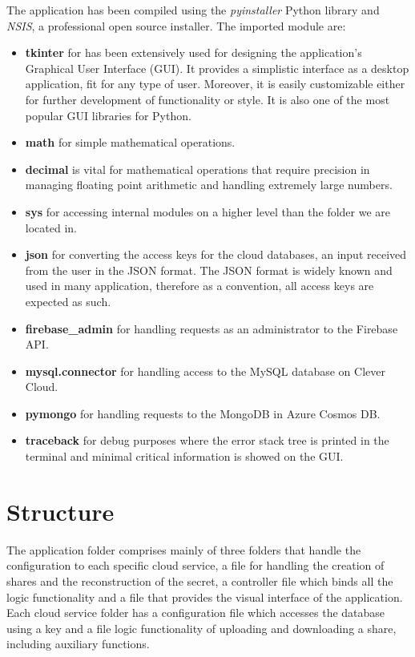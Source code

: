 \documentclass[12pt, a4paper, oneside]{book}
\begin{document}
    The application has been compiled using the {\it pyinstaller} Python library and {\it NSIS}, a professional open source installer. The imported module are: 
    \begin{itemize}
        \item \textbf{tkinter} for has been extensively used for designing the application's Graphical User Interface (GUI). It provides a simplistic interface as a desktop application, fit for any type of user. Moreover, it is easily customizable either for further development of functionality or style. It is also one of the most popular GUI libraries for Python.
        \item \textbf{math} for simple mathematical operations. \item \textbf{decimal} is vital for mathematical operations that require precision in managing floating point arithmetic and handling extremely large numbers. 
        \item \textbf{sys} for accessing internal modules on a higher level than the folder we are located in. 
        \item \textbf{json} for converting the access keys for the cloud databases, an input received from the user in the JSON format. The JSON format is widely known and used in many application, therefore as a convention, all access keys are expected as such.
    \end{itemize}
    \begin{itemize}
        \item \textbf{firebase\_admin} for handling requests as an administrator to the Firebase API.
        \item \textbf{mysql.connector} for handling access to the MySQL database on Clever Cloud.
        \item \textbf{pymongo} for handling requests to the MongoDB in Azure Cosmos DB.
        \item \textbf{traceback} for debug purposes where the error stack tree is printed in the terminal and minimal critical information is showed on the GUI.
    \end{itemize}
    \section{Structure}
    The application folder comprises mainly of three folders that handle the configuration to each specific cloud service, a file for handling the creation of shares and the reconstruction of the secret, a controller file which binds all the logic functionality and a file that provides the visual interface of the application. Each cloud service folder has a configuration file which accesses the database using a key and a file logic functionality of uploading and downloading a share, including auxiliary functions. 
    
\end{document}
